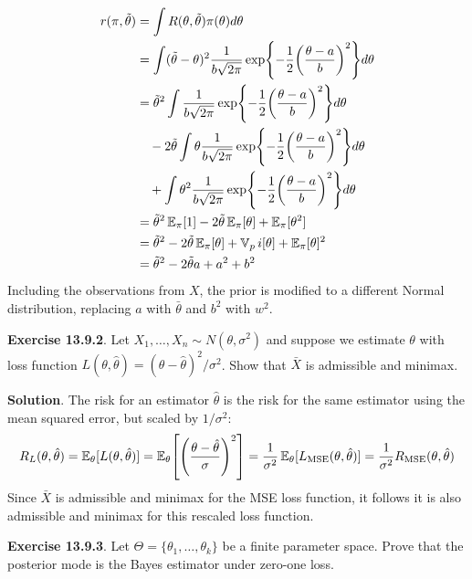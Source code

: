\begin{align*}
r(\pi, \tilde{\theta}) &= \int R(\theta, \tilde{\theta}) \pi(\theta) d\theta 
\\
&= \int (\tilde{\theta} - \theta)^{2} \frac{1}{b \sqrt{2 \pi}} \exp \left\{ -\frac{1}{2} \left(\frac{\theta - a}{b}\right)^{2} \right\} d\theta 
\\
&= \tilde{\theta}^{2} \int \frac{1}{b \sqrt{2 \pi}} \exp \left\{ -\frac{1}{2} \left(\frac{\theta - a}{b}\right)^{2} \right\} d\theta
\\
& \quad
- 2 \tilde{\theta} \int \theta \frac{1}{b \sqrt{2 \pi}} \exp \left\{ -\frac{1}{2} \left(\frac{\theta - a}{b}\right)^{2} \right\} d\theta
\\
& \quad
+ \int \theta^{2} \frac{1}{b \sqrt{2 \pi}} \exp \left\{ -\frac{1}{2} \left(\frac{\theta - a}{b}\right)^{2} \right\} d\theta 
\\
&= \tilde{\theta}^{2} \EXP_\pi[1] - 2 \tilde{\theta} \EXP_\pi[\theta] + \EXP_\pi[\theta^{2}] 
\\
&= \tilde{\theta}^{2} - 2 \tilde{\theta} \EXP_\pi[\theta] + \VAR_pi[\theta] + \EXP_\pi[\theta]^{2} 
\\
&= \tilde{\theta}^{2} - 2 \tilde{\theta} a + a^{2} + b^{2}
\end{align*}
Including the observations from \(X\), the prior is modified to a
different Normal distribution, replacing \(a\) with
\(\bar{\theta}\) and \(b^{2}\) with \(w^{2}\).

\textbf{Exercise 13.9.2}. Let
\(X_{1}, \dots, X_{n} \sim N(\theta, \sigma^{2})\) and suppose we estimate
\(\theta\) with loss function
\(L(\theta, \hat{\theta}) = (\theta - \hat{\theta})^{2} / \sigma^{2}\). Show
that \(\bar{X}\) is admissible and minimax.

\textbf{Solution}.
The risk for an estimator \(\hat{\theta}\) is the risk for the same
estimator using the mean squared error, but scaled by \(1 / \sigma^{2}\):
\[
R_L(\theta, \hat{\theta}) = \EXP_{\theta}[L(\theta, \hat{\theta})] 
= \EXP_{\theta}\left[\left( \frac{\theta - \hat{\theta}}{\sigma} \right)^{2} \right] 
= \frac{1}{\sigma^{2}} \EXP_{\theta}[ L_{\MSE}(\theta, \hat{\theta})]  
= \frac{1}{\sigma^{2}} R_{\MSE}(\theta, \hat{\theta})
\]
Since \(\bar{X}\) is admissible and minimax for the MSE loss
function, it follows it is also admissible and minimax for this rescaled
loss function.

\textbf{Exercise 13.9.3}. Let
\(\Theta = \{ \theta_{1}, \dots, \theta_{k} \}\) be a finite parameter
space. Prove that the posterior mode is the Bayes estimator under
zero-one loss.

